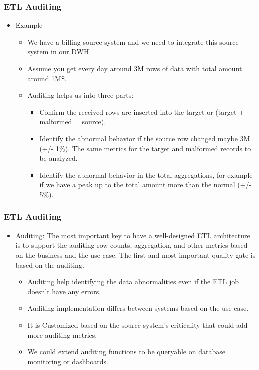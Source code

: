\begin{frame}
	\frametitle{ETL Auditing}
	\begin{itemize}
		\item Example
		\begin{itemize}
			\item We have a billing source system and we need to integrate this source system in our DWH.
			\item Assume you get every day around 3M rows of data with total amount around 1M\$.
			\item Auditing helps us into three parts:
			\begin{itemize}
				\item Confirm the received rows are inserted into the target or (target + malformed = source).
				\item Identify the abnormal behavior if the source row changed maybe 3M (+/- 1\%). The same metrics for the target and malformed records to be analyzed.
				\item Identify the abnormal behavior in the total aggregations, for example if we have a peak up to the total amount more than the normal (+/- 5\%).
			\end{itemize}
		\end{itemize}
	\end{itemize}
\end{frame}


\begin{frame}
	\frametitle{ETL Auditing}
	\begin{itemize}
		\item Auditing: The most important key to have a well-designed ETL architecture is to support the auditing row counts, aggregation, and other metrics based on the business and the use case. The first and most important quality gate is based on the auditing.

		\begin{itemize}
			\item Auditing help identifying the data abnormalities even if the ETL job doesn't have any errors.
			\item Auditing implementation differs between systems based on the use case.
			\item It is Customized based on the source system's criticality that could add more auditing metrics.
			\item We could extend auditing functions to be queryable on database monitoring or dashboards.


		\end{itemize}
	\end{itemize}
\end{frame}



